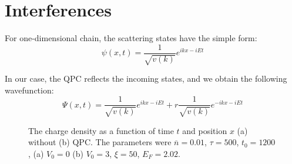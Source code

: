 \documentclass[aps,prl,preprint,groupedaddress]{revtex4-1}
\begin{document}
 
\section{Interferences}
For one-dimensional chain, the scattering states have the simple form:
\begin{equation}
	\psi(x,t) =  \frac{1}{\sqrt{v(k)}} e^{ikx - iEt}
\end{equation}

In our case, the QPC reflects the incoming states, and we obtain the following wavefunction:
\begin{equation}
\Psi(x,t) = \frac{1}{\sqrt{v(k)}} e^{ikx - iEt} + r\frac{1}{\sqrt{v(k)}} e^{-ikx - iEt}
\end{equation}
%
%	
\begin{figure}[!h]
	\centering
	\qquad
	\caption{The charge density as a function of time $t$ and position $x$ (a) without (b) QPC. The parameters were $\overline{n} =0.01$, $\tau = 500$, $t_0 =1200$, (a) $V_0 = 0$ (b) $V_0 = 3$, $\xi = 50$, $E_F =2.02$.}
	
	\label{fig:density_comp_reflec}%
\end{figure}
\end{document}
